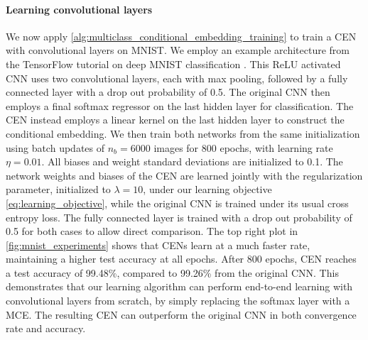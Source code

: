 \documentclass{llncs}
\begin{document}
	
	\paragraph{Learning convolutional layers}
	
	We now apply \cref{alg:multiclass_conditional_embedding_training} to train a \gls{CEN} with convolutional layers on MNIST. We employ an example architecture from the TensorFlow tutorial on deep MNIST classification \citep{abadi2016tensorflow}. This ReLU activated \gls{CNN} uses two convolutional layers, each with max pooling, followed by a fully connected layer with a drop out probability of 0.5. The original \gls{CNN} then employs a final softmax regressor on the last hidden layer for classification. The \gls{CEN} instead employs a linear kernel on the last hidden layer to construct the conditional embedding. We then train both networks from the same initialization using batch updates of $n_{b} = 6000$ images for 800 epochs, with learning rate $\eta = 0.01$. All biases and weight standard deviations are initialized to 0.1. The network weights and biases of the \gls{CEN} are learned jointly with the regularization parameter, initialized to $\lambda = 10$, under our learning objective \eqref{eq:learning_objective}, while the original \gls{CNN} is trained under its usual cross entropy loss. The fully connected layer is trained with a drop out probability of 0.5 for both cases to allow direct comparison. The top right plot in \cref{fig:mnist_experiments} shows that \glspl{CEN} learn at a much faster rate, maintaining a higher test accuracy at all epochs. After 800 epochs, \gls{CEN} reaches a test accuracy of 99.48\%, compared to 99.26\% from the original \gls{CNN}. This demonstrates that our learning algorithm can perform end-to-end learning with convolutional layers from scratch, by simply replacing the softmax layer with a \gls{MCE}. The resulting \gls{CEN} can outperform the original \gls{CNN} in both convergence rate and accuracy.
	
\end{document}
